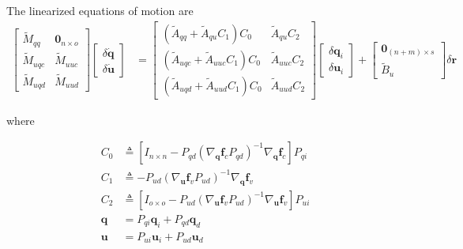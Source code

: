 \documentclass[smallcondensed,final]{svjour3}                     %
\begin{document}
The linearized equations of motion are
\begin{align}
  \label{eq:state_space_constrained}
  \left[
    \begin{array}{cc}
      \tilde{M}_{qq} & \bm{0}_{n \times o} \\
      \tilde{M}_{uqc} & \tilde{M}_{uuc} \\
      \tilde{M}_{uqd} & \tilde{M}_{uud}
    \end{array}
    \right]
    \left[
      \begin{array}{c}
        \delta \bm{\dot{q}} \\
        \delta \bm{\dot{u}}
      \end{array}
    \right]
   &=
   \left[
     \begin{array}{cc}
       (\tilde{A}_{qq} + \tilde{A}_{qu} C_1 ) C_0 & \tilde{A}_{qu} C_2 \\
       (\tilde{A}_{uqc} + \tilde{A}_{uuc} C_1 ) C_0 & \tilde{A}_{uuc} C_2\\
       (\tilde{A}_{uqd} + \tilde{A}_{uud} C_1 ) C_0 & \tilde{A}_{uud} C_2
     \end{array}
   \right]
    \left[
      \begin{array}{c}
        \delta \bm{q}_i \\
        \delta \bm{u}_i
      \end{array}
    \right]
    +
    \left[
      \begin{array}{c}
        \bm{0}_{(n+m) \times s} \\
        \tilde{B}_{u}
      \end{array}
    \right]
    \delta \bm{r}
\end{align}

where

\begin{align}
  \label{eq:C_0}
  C_0 &\triangleq \left[ I_{n \times n} - P_{qd}(\nabla_{\bm{q}}
    \bm{f}_{c} P_{qd})^{-1} \nabla_{\bm{q}} \bm{f}_{c} \right] P_{qi}\\
  \label{eq:C_1}
  C_1 &\triangleq -P_{ud}(\nabla_{\bm{u}} \bm{f}_{v} P_{ud})^{-1}
  \nabla_{\bm{q}} \bm{f}_{v} \\
  \label{eq:C_2}
  C_2 &\triangleq \left[I_{o \times o} - P_{ud} (\nabla_{\bm{u}}\bm{f}_{v} P_{ud})^{-1} \nabla_{\bm{u}}
    \bm{f}_{v} \right] P_{ui}\\
  \label{eq:Pq}
  \bm{q} &= P_{qi} \bm{q}_{i} + P_{qd} \bm{q}_{d} \\
  \label{eq:Pu}
  \bm{u} &= P_{ui} \bm{u}_{i} + P_{ud} \bm{u}_{d}
\end{align}
\end{document}
